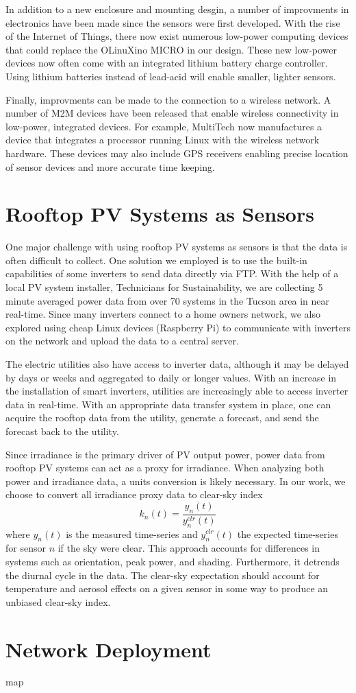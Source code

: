 In addition to a new enclosure and mounting desgin, a number of
improvments in electronics have been made since the sensors were first
developed.
With the rise of the Internet of Things, there now exist numerous
low-power computing devices that could replace the OLinuXino MICRO in
our design.
These new low-power devices now often come with an integrated lithium
battery charge controller.
Using lithium batteries instead of lead-acid will enable smaller,
lighter sensors.

Finally, improvments can be made to the connection to a wireless
network.
A number of M2M devices have been released that enable wireless
connectivity in low-power, integrated devices.
For example, MultiTech now manufactures a device that integrates a
processor running Linux with the wireless network hardware.
These devices may also include GPS receivers enabling precise location
of sensor devices and more accurate time keeping.

\section{Rooftop PV Systems as Sensors}

One major challenge with using rooftop PV systems as sensors is that
the data is often difficult to collect.
One solution we employed is to use the built-in capabilities of some
inverters to send data directly via FTP.
With the help of a local PV system installer, Technicians for
Sustainability, we are collecting 5 minute averaged power data from
over 70 systems in the Tucson area in near real-time.
Since many inverters connect to a home owners network, we also
explored using cheap Linux devices (Raspberry Pi) to communicate with
inverters on the network and upload the data to a central server.

The electric utilities also have access to inverter data, although it
may be delayed by days or weeks and aggregated to daily or longer values.
With an increase in the installation of smart inverters, utilities are
increasingly able to access inverter data in real-time.
With an appropriate data transfer system in place, one can acquire
the rooftop data from the utility, generate a forecast, and send the
forecast back to the utility.

Since irradiance is the primary driver of PV output power, power data
from rooftop PV systems can act as a proxy for irradiance.
When analyzing both power and irradiance data, a units conversion is
likely necessary.
In our work, we choose to convert all irradiance proxy data to
clear-sky index
\begin{equation}
\label{eq:clrind}
k_n(t) = \frac{y_n(t)}{y_n^{clr}(t)}
\end{equation}
where $y_n(t)$ is the measured time-series and $y_n^{clr}(t)$ the
expected time-series for sensor $n$ if the sky were clear.
This approach accounts for differences in systems such as orientation,
peak power, and shading.
Furthermore, it detrends the diurnal cycle in the data.
The clear-sky expectation should account for temperature and aerosol
effects on a given sensor in some way to produce an unbiased clear-sky
index.

\section{Network Deployment}
map

